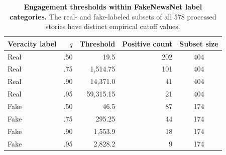 \begin{table}[!ht]
\centering
\caption{{\bf Engagement thresholds within FakeNewsNet label categories.} The real- and fake-labeled subsets of all 578 processed stories have distinct empirical cutoff values.}
\label{tab:subset-thresholds}
\small
\begin{tabular}{lrrrc}
\toprule
Veracity label & $q$ & Threshold & Positive count & Subset size \\
\midrule
Real & .50 & 19.5 & 202 & 404 \\
Real & .75 & 1,514.75 & 101 & 404 \\
Real & .90 & 14,371.0 & 41 & 404 \\
Real & .95 & 59,315.15 & 21 & 404 \\
\midrule
Fake & .50 & 46.5 & 87 & 174 \\
Fake & .75 & 295.25 & 44 & 174 \\
Fake & .90 & 1,553.9 & 18 & 174 \\
Fake & .95 & 2,828.2 & 9 & 174 \\
\bottomrule
\end{tabular}
\end{table}
